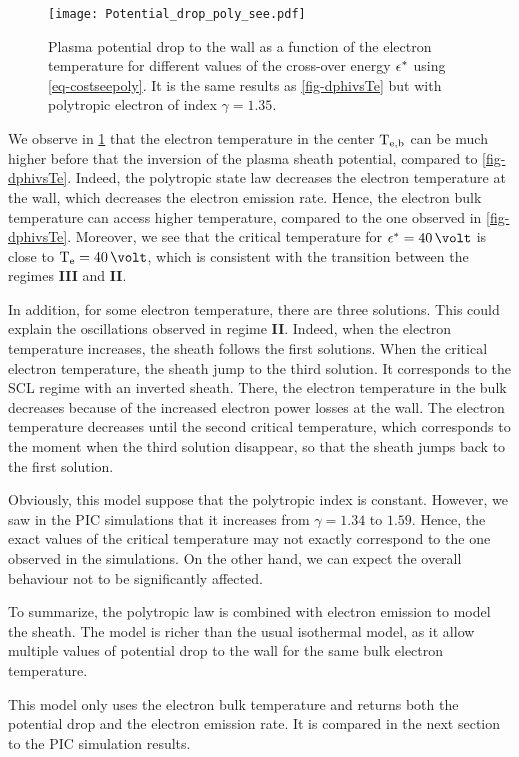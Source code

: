 \begin{figure}[hbtp]
  \centering
  \texttt{[image: Potential\_drop\_poly\_see.pdf]}
  \caption{ Plasma potential drop to the wall as a function of the electron temperature for different values of the cross-over energy $\epsilon^{*}$ using \cref{eq-costseepoly}. It is the same results as  \cref{fig-dphivsTe} but with polytropic electron of index $\gamma=1.35$.}
  \label{fig-rso_crit_see}
\end{figure}

We observe in \cref{fig-rso_crit_see} that the electron temperature in the center $\mathrm{T_{e, b}}$ can be much higher before that the inversion of the plasma sheath potential, compared to \cref{fig-dphivsTe}.
Indeed, the polytropic state law decreases the electron temperature at the wall, which decreases the electron emission rate.
Hence, the electron bulk temperature can access higher temperature, compared to the one observed in \cref{fig-dphivsTe}.
Moreover, we see that the critical temperature for $\crover=40 \,\volt$ is close to $\Te=40\,\volt$, which is consistent with the transition between the regimes {\bf III} and {\bf II}.

In addition, for some electron temperature, there are three solutions.
This could explain the oscillations observed in regime {\bf II}.
Indeed, when the electron temperature increases, the sheath follows the first solutions.
When the critical electron temperature, the sheath jump to the third solution.
It corresponds to the \ac{SCL} regime with an inverted sheath.
There, the electron temperature in the bulk decreases because of the increased electron power losses at the wall.
The electron temperature decreases until the second critical temperature, which corresponds to the moment when the third solution disappear, so that the sheath jumps back to the first solution.

Obviously, this model suppose that the polytropic index is constant.
However, we saw in the \ac{PIC} simulations that it increases from $\gamma = 1.34$ to $1.59$.
Hence, the exact values of the critical temperature may not exactly correspond to the one observed in the simulations.
On the other hand, we can expect the overall behaviour not to be significantly affected.

\vspace{1em}
To summarize, the polytropic law is combined with electron emission to model the sheath.
The model is richer than the usual isothermal model, as it allow multiple values of potential drop to the wall for the same bulk electron temperature.

This model only uses the electron bulk temperature and returns both the potential drop and the electron emission rate.
It is compared in the next section to the \ac{PIC} simulation results.
